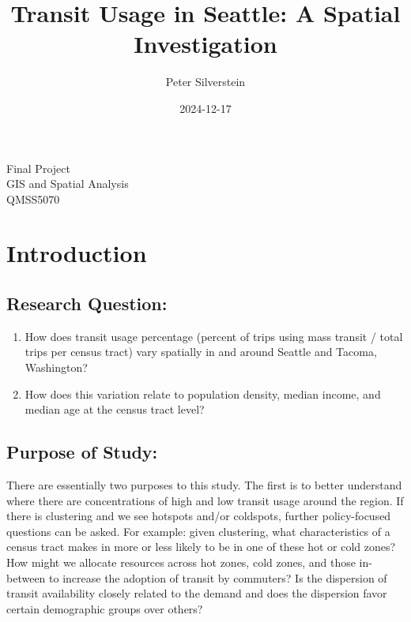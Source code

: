 \documentclass[
]{article}
\title{Transit Usage in Seattle: A Spatial Investigation}
\author{Peter Silverstein}
\date{2024-12-17}
\providecommand{\tightlist}{%
  \setlength{\itemsep}{0pt}\setlength{\parskip}{0pt}}
\begin{document}
\maketitle

\begin{center}
    {\large Final Project}\\[0.5cm]
    {\large GIS and Spatial Analysis}\\[0.5cm]
    {\large QMSS5070}\\[0.5cm]
\end{center}

\newpage

\tableofcontents

\newpage

\section{Introduction}\label{introduction}

\subsection{Research Question:}\label{research-question}

\begin{enumerate}
\def\labelenumi{\arabic{enumi}.}
\tightlist
\item
  How does transit usage percentage (percent of trips using mass transit
  / total trips per census tract) vary spatially in and around Seattle
  and Tacoma, Washington?
\item
  How does this variation relate to population density, median income,
  and median age at the census tract level?
\end{enumerate}

\subsection{Purpose of Study:}\label{purpose-of-study}

There are essentially two purposes to this study. The first is to better
understand where there are concentrations of high and low transit usage
around the region. If there is clustering and we see hotspots and/or
coldspots, further policy-focused questions can be asked. For example:
given clustering, what characteristics of a census tract makes in more
or less likely to be in one of these hot or cold zones? How might we
allocate resources across hot zones, cold zones, and those in-between to
increase the adoption of transit by commuters? Is the dispersion of
transit availability closely related to the demand and does the
dispersion favor certain demographic groups over others?
\end{document}
